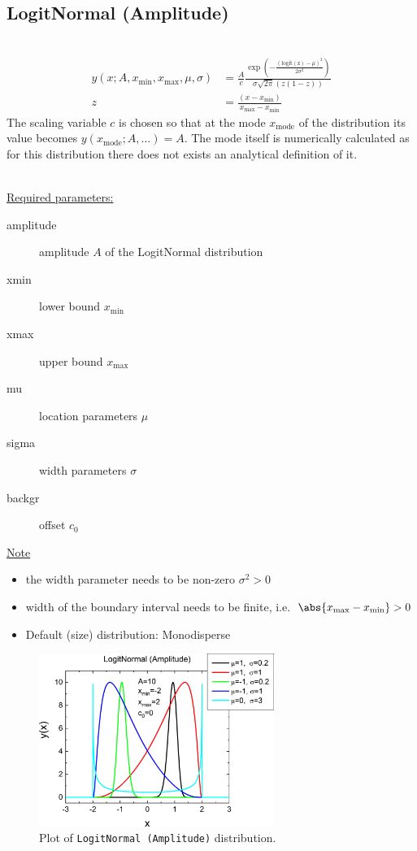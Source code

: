\subsection{LogitNormal (Amplitude)} ~\\
\label{sec:LogitAmplitude}
\begin{align}
y(x; A,x_\mathrm{min},x_\mathrm{max},\mu,\sigma) &= \frac{A}{c} \frac{\exp\left(-\frac{\left(\operatorname{logit(z)}-\mu\right)^2}{2\sigma^2}\right)} {\sigma\sqrt{2\pi}\left(z(1-z)\right)} \\
z &= \frac{\left(x-x_\mathrm{min}\right)}{x_\mathrm{max}-x_\mathrm{min}}
\end{align}
The scaling variable $c$ is chosen so that at the mode $x_\mathrm{mode}$ of the distribution its value becomes $y(x_\mathrm{mode}; A,\ldots) = A$. The mode itself is numerically calculated as for this distribution there does not exists an analytical definition of it.

 ~\\

\uline{Required parameters:}
\begin{description}
    \item[amplitude] amplitude $A$ of the LogitNormal distribution
    \item[xmin] lower bound $x_\mathrm{min}$
    \item[xmax] upper bound $x_\mathrm{max}$
    \item[mu] location parameters $\mu$
    \item[sigma] width parameters $\sigma$
    \item[backgr] offset $c_0$
\end{description}

\uline{Note}
\begin{itemize}
  \item the width parameter needs to be non-zero $\sigma^2 > 0$
  \item width of the boundary interval needs to be finite, i.e.\ $\abs{x_\mathrm{max}-x_\mathrm{min}}>0$
  \item Default (size) distribution: Monodisperse
\end{itemize}

\begin{figure}[htb]
\begin{center}
\includegraphics[width=0.6824\textwidth]{../images/peaks/LogitNormal/LogitAmplitude.png}
\end{center}
\caption{Plot of \texttt{LogitNormal (Amplitude)} distribution.}
\label{fig:LogitAmplitude}
\end{figure}

